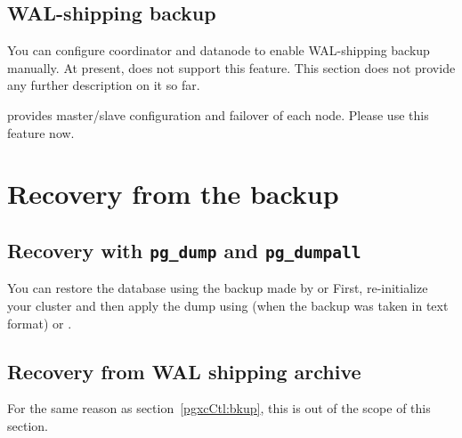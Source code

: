 \section{WAL-shipping backup}

  You can configure \XC{} coordinator and datanode to enable WAL-shipping backup manually.
  At present,  does not support this feature.
  This section does not provide any further description on it so far.
  
   provides master/slave configuration and failover of each node.
  Please use this feature now.


%
%
\chapter{Recovery from the backup}



\section{Recovery with \texttt{pg\_dump} and \texttt{pg\_dumpall}}

	You can restore the database using the backup made by  or
	First, re-initialize your cluster and then apply the dump using 
	(when the backup was taken in text format) or .



\section{Recovery from WAL shipping archive}

  For the same reason as section~\ref{pgxcCtl:bkup}, this is out of the scope of
  this section. 


%
%
